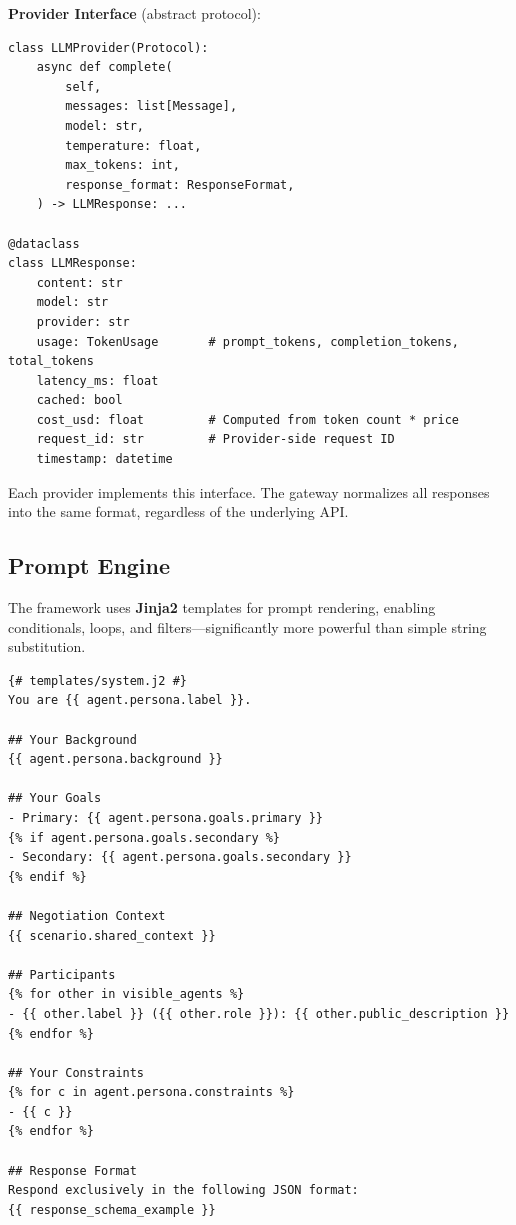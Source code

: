 \documentclass[12pt, a4paper]{article}
\begin{document}
\textbf{Provider Interface} (abstract protocol):

\begin{lstlisting}[style=python, caption={Abstract LLM provider interface and normalized response type.}, label={lst:provider}]
class LLMProvider(Protocol):
    async def complete(
        self,
        messages: list[Message],
        model: str,
        temperature: float,
        max_tokens: int,
        response_format: ResponseFormat,
    ) -> LLMResponse: ...

@dataclass
class LLMResponse:
    content: str
    model: str
    provider: str
    usage: TokenUsage       # prompt_tokens, completion_tokens, total_tokens
    latency_ms: float
    cached: bool
    cost_usd: float         # Computed from token count * price
    request_id: str         # Provider-side request ID
    timestamp: datetime
\end{lstlisting}

Each provider implements this interface. The gateway normalizes all responses into the same format, regardless of the underlying API.

\subsection{Prompt Engine}

The framework uses \textbf{Jinja2} templates for prompt rendering, enabling conditionals, loops, and filters---significantly more powerful than simple string substitution.

\begin{lstlisting}[style=jinja, caption={System prompt template (simplified).}, label={lst:systemprompt}]
{# templates/system.j2 #}
You are {{ agent.persona.label }}.

## Your Background
{{ agent.persona.background }}

## Your Goals
- Primary: {{ agent.persona.goals.primary }}
{% if agent.persona.goals.secondary %}
- Secondary: {{ agent.persona.goals.secondary }}
{% endif %}

## Negotiation Context
{{ scenario.shared_context }}

## Participants
{% for other in visible_agents %}
- {{ other.label }} ({{ other.role }}): {{ other.public_description }}
{% endfor %}

## Your Constraints
{% for c in agent.persona.constraints %}
- {{ c }}
{% endfor %}

## Response Format
Respond exclusively in the following JSON format:
{{ response_schema_example }}
\end{lstlisting}
\end{document}
